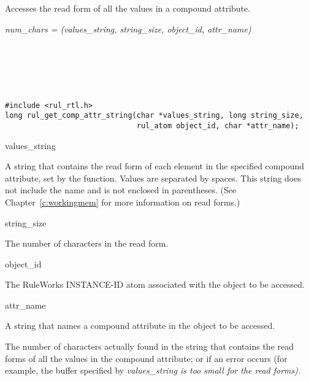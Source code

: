 Accesses the read form of all the values in a compound attribute.

\Syntax

\it{num\_chars} = (\it{values\_string},
\it{string\_size}, \it{object\_id}, \it{attr\_name})

\begin{args}
   \\
   \\
   \\
   \\
\end{args}

\CBinding
\begin{verbatim}
#include <rul_rtl.h>
long rul_get_comp_attr_string(char *values_string, long string_size,
                              rul_atom object_id, char *attr_name);
\end{verbatim}

\begin{arguments}
\item[values\_string]

  A string that contains the read form of each element in the
  specified compound attribute, set by the function. Values are
  separated by spaces. This string does not include the name
   and is not enclosed in parentheses. (See
  Chapter~\ref{c:workingmem} for more information on read forms.)

\item[string\_size]

  The number of characters in the read form.

\item[object\_id]

  The RuleWorks INSTANCE-ID atom associated with the object to be
  accessed.

\item[attr\_name]

  A string that names a compound attribute in the object to be
  accessed.
\end{arguments}

\ReturnValue

The number of characters actually found in the string that contains
the read forms of all the values in the compound attribute; or
 if an error occurs (for example, the buffer
specified by \it{values\_string} is too small for the read forms).

